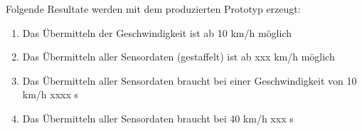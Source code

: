 %
%
%
%
%



Folgende Resultate werden mit dem produzierten Prototyp erzeugt:


\begin{enumerate}
    \item Das Übermitteln der Geschwindigkeit ist ab 10 km/h möglich
    \item Das Übermitteln aller Sensordaten (gestaffelt) ist ab xxx km/h möglich
    \item Das Übermitteln aller Sensordaten braucht bei einer Geschwindigkeit von 10 km/h xxxx s
    \item Das Übermitteln aller Sensordaten braucht bei 40 km/h xxx s
\end{enumerate}


